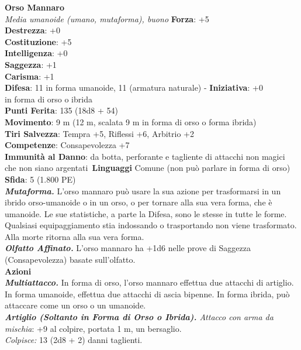 \begin{multicols}{2}
\medskip\textbf{Orso Mannaro}\\
\emph{Media umanoide (umano, mutaforma), buono}
\textbf{Forza}: +5\\
\textbf{Destrezza}: +0\\
\textbf{Costituzione}: +5\\
\textbf{Intelligenza}: +0\\
\textbf{Saggezza}: +1\\
\textbf{Carisma}: +1\\
\textbf{Difesa}: 11 in forma umanoide, 11 (armatura naturale) - \textbf{Iniziativa}: +0\\
in forma di orso o ibrida\\
\textbf{Punti Ferita}: 135 (18d8 + 54)\\
\textbf{Movimento}: 9 m (12 m, scalata 9 m in forma di orso o forma ibrida) \\
\textbf{Tiri Salvezza}:  Tempra +5, Riflessi +6, Arbitrio +2\\
\textbf{Competenze}: Consapevolezza +7\\
\textbf{Immunità al Danno}: da botta, perforante e tagliente di attacchi non magici che non siano argentati\
\textbf{Linguaggi} Comune (non può parlare in forma di orso)\\
\textbf{Sfida}: 5 (1.800 PE)\smallskip\\
\emph{\textbf{Mutaforma.}} L'orso mannaro può usare la sua azione per trasformarsi in un ibrido orso-umanoide o in un orso, o per tornare alla sua vera forma, che è umanoide. Le sue statistiche, a parte la Difesa, sono le stesse in tutte le forme. Qualsiasi equipaggiamento stia indossando o trasportando non viene trasformato. Alla morte ritorna alla sua vera forma.\\
\emph{\textbf{Olfatto Affinato.}} L'orso mannaro ha +1d6 nelle prove di Saggezza (Consapevolezza) basate sull'olfatto.\\
\smallskip\textbf{Azioni}\\
\emph{\textbf{Multiattacco.}} In forma di orso, l'orso mannaro effettua due attacchi di artiglio. In forma umanoide, effettua due attacchi di ascia bipenne. In forma ibrida, può attaccare come un orso o un umanoide.\\

\emph{\textbf{Artiglio (Soltanto in Forma di Orso o Ibrida).} Attacco con arma da mischia}: +9 al colpire, portata 1 m, un bersaglio.\\
\emph{Colpisce:} 13 (2d8 + 2) danni taglienti.\\


\end{multicols}
